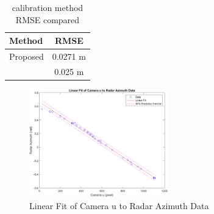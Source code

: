 \begin{table}[h!]
    \begin{center}
      \label{tab:table4}
      \begin{tabular}{l|c} %
        \textbf{Method} & \textbf{RMSE} \\%
        \hline
        Proposed                            & 0.0271 m \\%
        \citeauthor{8794186}\cite{8794186}  & 0.025 m \\%
      \end{tabular}
    \end{center}
    \caption{calibration method RMSE compared}
    \label{tab:callib_rmse}
  \end{table}

\begin{figure}[hpbt]
    \centering
    \includegraphics[width=6cm]{Figures/matlab/Linear Fit of Camera u to Radar Azimuth Data.png}%
    \caption{Linear Fit of Camera u to Radar Azimuth Data}
    \label{fig:Linear_Fit}
\end{figure}
\newpage
